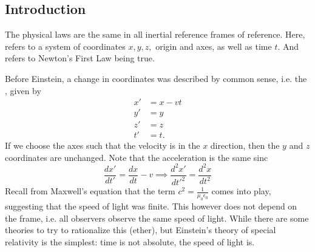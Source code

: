 \documentclass{article}
\numberwithin{equation}{section}
\begin{document}
\subsection{Introduction}
The  physical laws are the same in all inertial reference frames of reference. Here,  refers to a system of coordinates $x,y,z,$ origin and axes, as well as time $t.$ And  refers to Newton's First Law being true.

Before Einstein, a change in coordinates was described by common sense, i.e. the , given by
\begin{align}
    x' &= x - vt \\ 
    y' &= y \\
    z' &= z \\
    t' &= t.
\end{align}
If we choose the axes such that the velocity is in the $x$ direction, then the $y$ and $z$ coordinates are unchanged. Note that the acceleration is the same sinc 
\begin{equation}
    \frac{dx'}{dt'} = \frac{dx}{dt} - v \implies \frac{d^2x'}{dt'^2} = \frac{d^2x}{dt^2}
\end{equation}
Recall from Maxwell's equation that the term $c^2 = \frac{1}{\mu_0\epsilon_0}$ comes into play, suggesting that the speed of light was finite. This however does not depend on the frame, i.e. all observers observe the same speed of light. While there are some theories to try to rationalize this (ether), but Einstein's theory of special relativity is the simplest: time is not absolute, the speed of light is.
\end{document}
